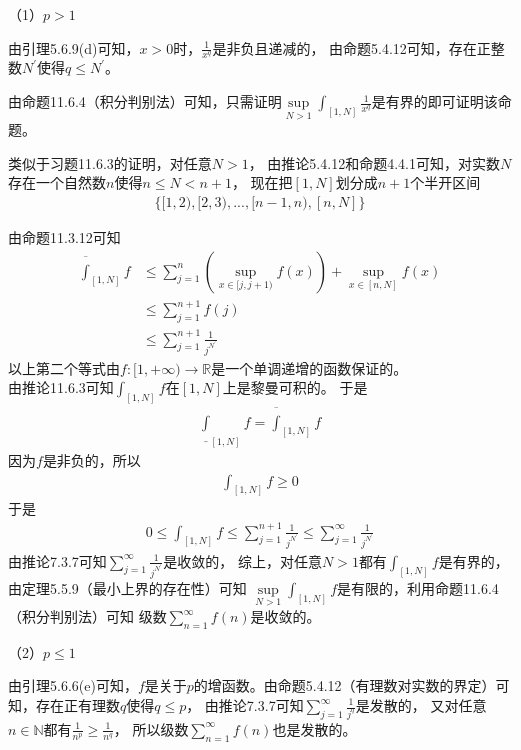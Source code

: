 \documentclass{article}
\begin{document}
（1）$p > 1$

由引理5.6.9(d)可知，$x > 0$时，$\frac{1}{x^q}$是非负且递减的，
由命题5.4.12可知，存在正整数$N^\prime$使得$q \leq N^\prime$。

由命题11.6.4（积分判别法）可知，只需证明$\sup\limits_{N > 1}\int_{[1, N]} \frac{1}{x^q}$是有界的即可证明该命题。

类似于习题11.6.3的证明，对任意$N>1$， 由推论5.4.12和命题4.4.1可知，对实数$N$存在一个自然数$n$使得$n \leq N < n + 1$，
现在把$[1, N]$划分成$n+1$个半开区间
\begin{align*}
  \{[1, 2),[2,3),...,[n-1, n), [n, N]\}
\end{align*}

由命题11.3.12可知
\begin{align*}
  \overline{\int}_{[1, N]} f & \leq \sum\limits_{j=1}^{n} \left( \sup\limits_{x \in [j, j+1)} f(x)  \right)
  + \sup\limits_{x \in [n, N]} f(x)                                                                         \\
                             & \leq \sum\limits_{j=1}^{n + 1} f(j)                                          \\
                             & \leq \sum\limits_{j=1}^{n + 1} \frac{1}{j^{N^\prime}}
\end{align*}
以上第二个等式由$f: [1, +\infty) \to \mathbb{R}$是一个单调递增的函数保证的。\\
由推论11.6.3可知$\int_{[1, N]} f$在$[1, N]$上是黎曼可积的。
于是
\begin{align*}
  \underline{\int}_{[1, N]} f = \overline{\int}_{[1, N]} f 
\end{align*}
因为$f$是非负的，所以
\begin{align*}
  \int_{[1, N]} f  \geq 0
\end{align*}
于是
\begin{align*}
  0 \leq \int_{[1, N]} f \leq \sum\limits_{j=1}^{n + 1} \frac{1}{j^{N^\prime}} \leq \sum\limits_{j=1}^{\infty} \frac{1}{j^{N^\prime}}
\end{align*}
由推论7.3.7可知$\sum\limits_{j=1}^{\infty} \frac{1}{j^{N^\prime}}$是收敛的，
综上，对任意$N > 1$都有$\int_{[1, N]} f$是有界的，由定理5.5.9（最小上界的存在性）可知
$\sup\limits_{N > 1}\int_{[1, N]} f$是有限的，利用命题11.6.4（积分判别法）可知
级数$\sum\limits_{n=1}^\infty f(n)$是收敛的。

（2）$p \leq 1$

由引理5.6.6(e)可知，$f$是关于$p$的增函数。由命题5.4.12（有理数对实数的界定）可知，存在正有理数$q$使得$q \leq p$，
由推论7.3.7可知$\sum\limits_{j=1}^{\infty} \frac{1}{j^{q}}$是发散的，
又对任意$n \in \mathbb{N}$都有$\frac{1}{n^p} \geq \frac{1}{n^q}$，
所以级数$\sum\limits_{n=1}^\infty f(n)$也是发散的。
\end{document}
